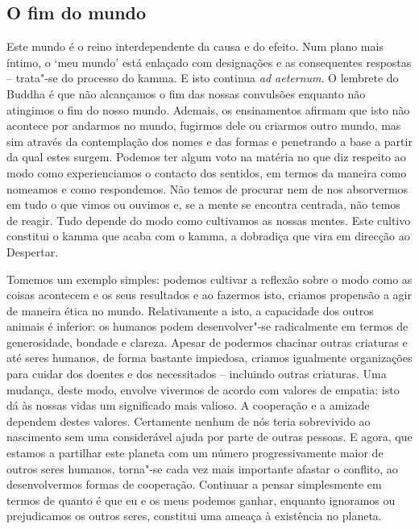 \subsection{O fim do mundo}

Este mundo é o reino interdependente da causa e do efeito. Num plano mais
íntimo, o `meu mundo' está enlaçado com designações e as consequentes respostas
-- trata"-se do processo do kamma. E isto continua \emph{ad aeternum}. O
lembrete do Buddha é que não alcançamos o fim das nossas convulsões enquanto não
atingimos o fim do nosso mundo.
Ademais, os ensinamentos afirmam que isto não acontece por andarmos no mundo,
fugirmos dele ou criarmos outro mundo, mas sim através da contemplação dos nomes
e das formas e penetrando a base a partir da qual estes surgem. Podemos ter
algum voto na matéria no que diz respeito ao modo como experienciamos o contacto
dos sentidos, em termos da maneira como nomeamos e como respondemos. Não temos
de procurar nem de nos absorvermos em tudo o que vimos ou ouvimos e, se a mente
se encontra centrada, não temos de reagir. Tudo depende do modo como cultivamos
as nossas mentes. Este cultivo constitui o kamma que acaba com o kamma, a
dobradiça que vira em direcção ao Despertar.

Tomemos um exemplo simples: podemos cultivar a reflexão sobre o modo como as
coisas acontecem e os seus resultados e ao fazermos isto, criamos propensão a
agir de maneira ética no mundo. Relativamente a isto, a capacidade dos outros
animais é inferior: os humanos podem desenvolver"-se radicalmente em termos de
generosidade, bondade e clareza. Apesar de podermos chacinar outras criaturas e
até seres humanos, de forma bastante impiedosa, criamos igualmente organizações
para cuidar dos doentes e dos necessitados -- incluindo outras criaturas. Uma
mudança, deste modo, envolve vivermos de acordo com valores de empatia: isto dá
às nossas vidas um significado mais valioso. A cooperação e a amizade dependem
destes valores. Certamente nenhum de nós teria sobrevivido ao nascimento sem uma
considerável ajuda por parte de outras pessoas. E agora, que estamos a partilhar
este planeta com um número progressivamente maior de outros seres humanos,
torna"-se cada vez mais importante afastar o conflito, ao desenvolvermos formas
de cooperação. Continuar a pensar simplesmente em termos de quanto é que eu e os
meus podemos ganhar, enquanto ignoramos ou prejudicamos os outros seres,
constitui uma ameaça à existência no planeta.

